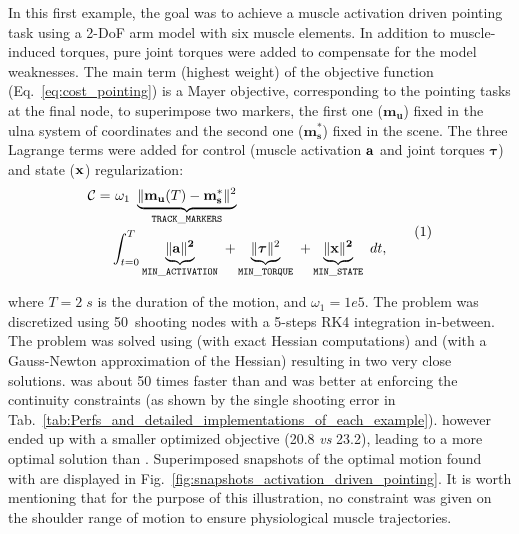 %
In this first example, the goal was to achieve a muscle activation driven pointing task using a 2-DoF arm model with six muscle elements. 
In addition to muscle-induced torques, pure joint torques were added to compensate for the model weaknesses.
The main term (highest weight) of the objective function (Eq.~\ref{eq:cost_pointing}) is a Mayer objective, corresponding to the pointing tasks at the final node, to superimpose two markers, the first one ($\mathbf{m_u}$) fixed in the ulna system of coordinates and the second one ($\mathbf{m^*_s}$) fixed in the scene.
The three Lagrange terms  were added for control (muscle activation $\bf{a}$ and joint torques $\boldsymbol{\tau}$) and state ($\bf{x}$) regularization:
\[
\begin{aligned}
	\mathcal{C} = 	&~\omega_1~\underbrace{\|\mathbf{m_u}(T)-\mathbf{m^*_s}\|^2}_{\mathtt{TRACK\_MARKERS}}~\\
	&\int_{t=0}^T\underbrace{\|\bf{a}\|^2}_{\mathtt{MIN\_ACTIVATION}}~
	+\underbrace{\|\boldsymbol\tau\|^2}_{\mathtt{MIN\_TORQUE}}~
	+\underbrace{\|\bf{x}\|^2}_{\mathtt{MIN\_STATE}}~ dt,
\end{aligned}
\addtag
\label{eq:cost_pointing}
\]

\noindent where $T\!=\!2\;s$ is the duration of the motion, and $\omega_1=1e5$.
The problem was discretized using 50~shooting nodes with a 5-steps RK4 integration in-between.
The problem was solved using \ipopt (with exact Hessian computations) and \acados (with a Gauss-Newton approximation of the Hessian) resulting in two very close solutions.
\acados was about 50 times faster than \ipopt and was better at enforcing the continuity constraints (as shown by the single shooting error in Tab.~\ref{tab:Perfs_and_detailed_implementations_of_each_example}).
\ipopt however ended up with a smaller optimized objective (20.8 \textit{vs} 23.2), leading to a more optimal solution than \acados. 
Superimposed snapshots of the optimal motion found with \acados are displayed in Fig.~\ref{fig:snapshots_activation_driven_pointing}.
It is worth mentioning that for the purpose of this illustration, no constraint was given on the shoulder range of motion to ensure physiological muscle trajectories. 








